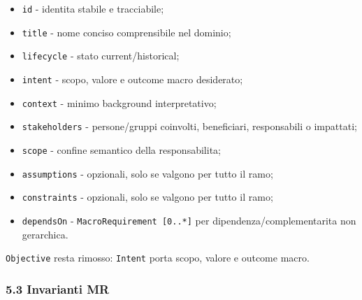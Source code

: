 \documentclass[
  9pt,
  a4paper,
]{article}
\providecommand{\tightlist}{%
  \setlength{\itemsep}{0pt}\setlength{\parskip}{0pt}}
\begin{document}
\begin{itemize}
\tightlist
\item
  \texttt{id} - identita stabile e tracciabile;
\item
  \texttt{title} - nome conciso comprensibile nel dominio;
\item
  \texttt{lifecycle} - stato current/historical;
\item
  \texttt{intent} - scopo, valore e outcome macro desiderato;
\item
  \texttt{context} - minimo background interpretativo;
\item
  \texttt{stakeholders} - persone/gruppi coinvolti, beneficiari,
  responsabili o impattati;
\item
  \texttt{scope} - confine semantico della responsabilita;
\item
  \texttt{assumptions} - opzionali, solo se valgono per tutto il ramo;
\item
  \texttt{constraints} - opzionali, solo se valgono per tutto il ramo;
\item
  \texttt{dependsOn} - \texttt{MacroRequirement\ {[}0..*{]}} per
  dipendenza/complementarita non gerarchica.
\end{itemize}

\texttt{Objective} resta rimosso: \texttt{Intent} porta scopo, valore e
outcome macro.

\subsubsection{5.3 Invarianti MR}\label{invarianti-mr}
\end{document}
